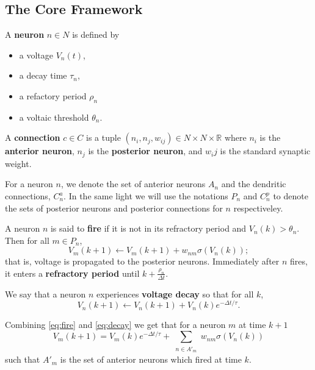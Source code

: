 \subsection{The Core Framework}

\begin{definition}\label{neuron}
	A \textbf{neuron} $n \in N$ is defined by
	\begin{itemize}
		\item a voltage $V_n(t)$,
		\item a decay time $\tau_n$,
		\item a refactory period $\rho_n$
		\item a voltaic threshold $\theta_n$.
	\end{itemize}
\end{definition}
\begin{definition}\label{connection}
	A \textbf{connection} $c \in C$ is a tuple $(n_i, n_j, w_{ij}) \in N \times N \times \mathbb{R}$
	where $n_i$ is  the \textbf{anterior neuron}, $n_j$ is the \textbf{posterior neuron}, and $w_ij$
	is the standard synaptic weight.
\end{definition}
For a neuron $n$, we denote the set of anterior neurons $A_n$ and the dendritic connections, $C_{n}^a$. In the same light we will use the notations $P_n$ and $C_n^p$ to denote the sets of posterior neurons and posterior connections for $n$ respectiveley.
\begin{definition}\label{fire}
	A neuron $n$ is said to \textbf{fire} if it is not in its refractory period and $V_n(k) > \theta_n$. Then for all $m \in P_n$, 
	\begin{equation}
		V_m(k+1) \leftarrow V_m(k+1) + w_{nm} \sigma(V_n(k)); \label{eq:fire}
	\end{equation}
	that is, voltage is propagated to the posterior neurons. 	Immediately after $n$ fires, it enters  a \textbf{refractory period} until $k + \frac{\rho_n}{\Delta t}$.
\end{definition}

\begin{definition}\label{decay}
	We say that a neuron $n$ experiences \textbf{voltage decay} so that for all $k$,
	\begin{equation}
		V_n(k+1) \leftarrow V_n(k+1) + V_n(k)e^{-\Delta t/\tau}. \label{eq:decay}
	\end{equation}
\end{definition}

Combining \eqref{eq:fire} and \eqref{eq:decay} we get that for a neuron $m$ at time $k+1$
\begin{equation}
	V_m(k+1) = V_m(k)e^{-\Delta  t/\tau} + \sum_{\substack{n \in A'_m}} w_{nm} \sigma(V_n(k))
\end{equation}
such that $A'_m$ is the set of anterior neurons which fired at time $k.$
